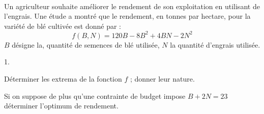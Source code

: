 \documentclass[11pt]{article}%
\begin{document}
\begin{exerciceSP}~\\
  Un agriculteur souhaite améliorer le rendement de son exploitation
  en utilisant de l'engrais. Une étude a montré que le rendement, en
  tonnes par hectare, pour la variété de blé cultivée est donné par :
  \[
  f\left( B,N\right) =120B-8B^{2}+4BN-2N^{2}
  \]
  $B$ désigne la, quantité de semences de blé utilisée, $N$ la
  quantité d'engrais utilisée.
  \begin{noliste}{1.}
    \setlength{\itemsep}{2mm}
  \item Déterminer les extrema de la fonction $f$ ; donner leur nature.
    
  \item Si on suppose de plus qu'une contrainte de budget impose
    $B+2N=23$ déterminer l'optimum de rendement.
  \end{noliste}
\end{exerciceSP}


\end{document}
